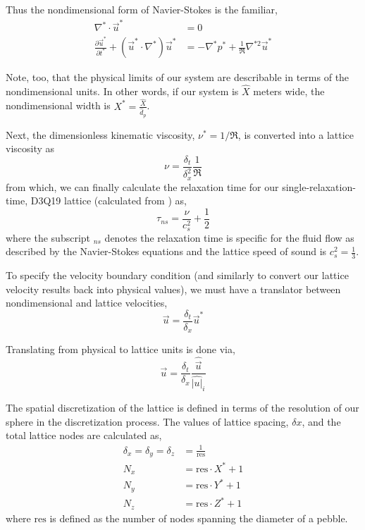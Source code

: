 Thus the nondimensional form of Navier-Stokes is the familiar,
\begin{subequations}\label{eq:non-dim-ns}
\begin{align}
	\nabla^* \cdot \vec{u}^* &= 0 \\
	\frac{\partial \vec{u}^*}{\partial t^*} + (\vec{u}^*\cdot\nabla^*)\vec{u}^* &= -\nabla^*p^* + \frac{1}{\Re}\nabla^{*2}\vec{u}^*
\end{align}
\end{subequations}

Note, too, that the physical limits of our system are describable in terms of the nondimensional units. In other words, if our system is $\hat{X}$ meters wide, the nondimensional width is $X^*=\frac{\hat{X}}{\hat{d}_p}$.  

Next, the dimensionless kinematic viscosity, $\nu^* = 1/\Re$, is converted into a lattice viscosity as
\begin{equation}\label{eq:fluid-nu}
	\nu = \frac{\delta_t}{\delta_x^2}\frac{1}{\Re}
\end{equation}
from which, we can finally calculate the relaxation time for our single-relaxation-time, D3Q19 lattice (calculated from ) as,
\begin{equation}
	\tau_{ns} = \frac{\nu}{c_s^2} + \frac{1}{2}
\end{equation}
where the subscript $_{ns}$ denotes the relaxation time is specific for the fluid flow as described by the Navier-Stokes equations and the lattice speed of sound is $c_s^2 = \frac{1}{3}$.

To specify the velocity boundary condition (and similarly to convert our lattice velocity results back into physical values), we must have a translator between nondimensional and lattice velocities,
\begin{equation}\label{eq:lbm-u}
	\vec{u} = \frac{\delta_t}{\delta_x}\vec{u}^*
\end{equation}

Translating from physical to lattice units is done via,
\begin{equation}
	\vec{u} = \frac{\delta_t}{\delta_x}\frac{\hat{\vec{u}}}{\hat{|u|}_i}
\end{equation}

The spatial discretization of the lattice is defined in terms of the resolution of our sphere in the discretization process. The values of lattice spacing, $\delta x$, and the total lattice nodes are calculated as,
\begin{subequations}
\begin{align}
	\delta_x = \delta_y = \delta_z & = \frac{1}{\text{res}} \\
	N_x & = \text{res}\cdot X^* +1\\
	N_y & = \text{res}\cdot Y^* +1\\
	N_z & = \text{res}\cdot Z^*+1
\end{align}
\end{subequations}
where $\text{res}$ is defined as the number of nodes spanning the diameter of a pebble. 

